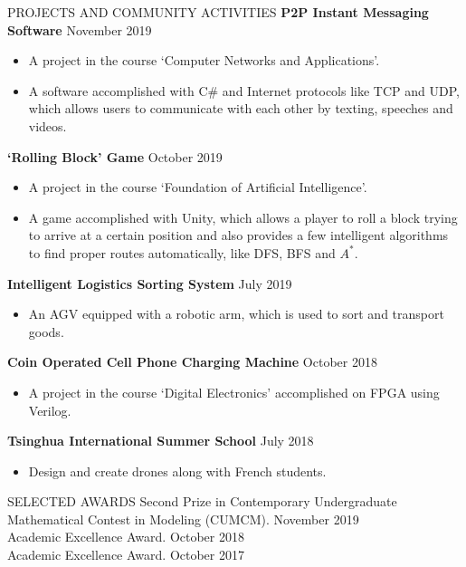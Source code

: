 \documentclass{resume} %
\begin{document}
\begin{rSection}{PROJECTS AND COMMUNITY ACTIVITIES} 
{\textbf{P2P Instant Messaging Software}} \hfill November 2019\\
	\begin{itemize}
	\item A project in the course `Computer Networks and Applications'.
	\item A software accomplished with C\# and Internet protocols like TCP and UDP, which allows users to communicate with each other by texting, speeches and videos.\\
	\end{itemize}
{\textbf{`Rolling Block' Game}} \hfill October 2019\\
	\begin{itemize}
	\item A project in the course `Foundation of Artificial Intelligence'.
	\item A game accomplished with Unity, which allows a player to roll a block trying to arrive at a certain position and also provides a few intelligent algorithms to find proper routes automatically, like DFS, BFS and $A^*$.\\
	\end{itemize}
{\textbf{Intelligent Logistics Sorting System}} \hfill July 2019\\
	\begin{itemize}
\item An AGV equipped with a robotic arm, which is used to sort and transport goods.\\
	\end{itemize}
{\textbf{Coin Operated Cell Phone Charging Machine}} \hfill October 2018\\
	\begin{itemize}
	\item A project in the course `Digital Electronics' accomplished on FPGA using Verilog.\\
	\end{itemize}
{\textbf{Tsinghua International Summer School}} \hfill July 2018\\
	\begin{itemize}
		\item Design and create drones along with French students.
	\end{itemize}
\end{rSection} 

\begin{rSection}{SELECTED AWARDS}
{Second Prize in Contemporary Undergraduate Mathematical Contest in Modeling (CUMCM).} \hfill November 2019\\
{ Academic Excellence Award.} \hfill October 2018\\ 
{ Academic Excellence Award.} \hfill October 2017\\ 


\end{rSection}
\end{document}
